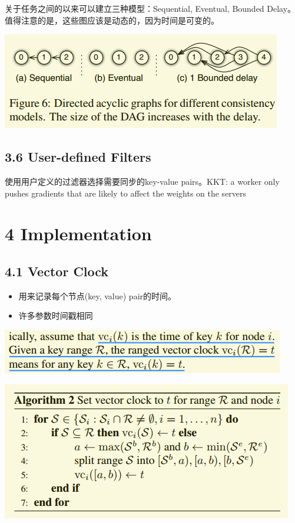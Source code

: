 \documentclass[11pt]{article}
\begin{document}
关于任务之间的以来可以建立三种模型：Sequential, Eventual, Bounded Delay。值得注意的是，这些图应该是动态的，因为时间是可变的。

\begin{center}
\includegraphics[width=.9\linewidth]{PS.org_imgs/20201110_184713_Wz0I8x.png}
\end{center}
\subsection{3.6 User-defined Filters}
\label{sec:orgd190094}
使用用户定义的过滤器选择需要同步的key-value pairs。KKT: a worker only pushes gradients that are likely to affect the weights on the servers
\section{4 Implementation}
\label{sec:org6e0b2d8}
\subsection{4.1 Vector Clock}
\label{sec:orgefe0b89}
\begin{itemize}
\item 用来记录每个节点(key, value) pair的时间。
\item 许多参数时间戳相同
\end{itemize}
\begin{center}
\includegraphics[width=.9\linewidth]{PS.org_imgs/20201110_185915_tUCyTP.png}
\end{center}

\begin{center}
\includegraphics[width=.9\linewidth]{PS.org_imgs/20201110_214651_eJdEsX.png}
\end{center}
\end{document}
